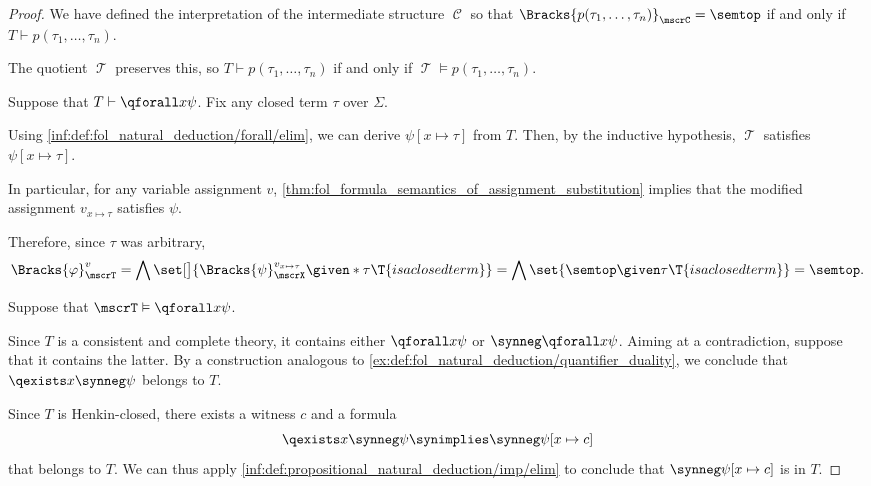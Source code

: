 \begin{proof}
   We have defined the interpretation of the intermediate structure \( \mscrC \) so that \( \Bracks{p(\tau_1, \ldots, \tau_n)}_\mscrC = \semtop \) if and only if \( T \vdash p(\tau_1, \ldots, \tau_n) \).

  The quotient \( \mscrT \) preserves this, so \( T \vdash p(\tau_1, \ldots, \tau_n) \) if and only if \( \mscrT \vDash p(\tau_1, \ldots, \tau_n) \).


  \SufficiencySubProof* Suppose that \( T \vdash \qforall x \psi \). Fix any closed term \( \tau \) over \( \Sigma \).

  Using \ref{inf:def:fol_natural_deduction/forall/elim}, we can derive \( \psi[x \mapsto \tau] \) from \( T \). Then, by the inductive hypothesis, \( \mscrT \) satisfies \( \psi[x \mapsto \tau] \).

  In particular, for any variable assignment \( v \), \cref{thm:fol_formula_semantics_of_assignment_substitution} implies that the modified assignment \( v_{x \mapsto \tau} \) satisfies \( \psi \).

  Therefore, since \( \tau \) was arbitrary,
  \begin{equation*}
    \Bracks{ \varphi }_\mscrT^v
    =
    \bigwedge\set[\big]{ \Bracks{\psi}_\mscrX^{v_{x \mapsto \tau}} \given* \tau \T{is a closed term} }
    =
    \bigwedge\set{ \semtop \given \tau \T{is a closed term} }
    =
    \semtop.
  \end{equation*}

  \NecessitySubProof* Suppose that \( \mscrT \vDash \qforall x \psi \).

  Since \( T \) is a consistent and complete theory, it contains either \( \qforall x \psi \) or \( \synneg \qforall x \psi \). Aiming at a contradiction, suppose that it contains the latter. By a construction analogous to \cref{ex:def:fol_natural_deduction/quantifier_duality}, we conclude that \( \qexists x \synneg \psi \) belongs to \( T \).

  Since \( T \) is Henkin-closed, there exists a witness \( c \) and a formula
  \begin{equation*}
    \qexists x \synneg \psi \synimplies \synneg \psi[x \mapsto c]
  \end{equation*}
  that belongs to \( T \). We can thus apply \ref{inf:def:propositional_natural_deduction/imp/elim} to conclude that \( \synneg \psi[x \mapsto c] \) is in \( T \).


\end{proof}
